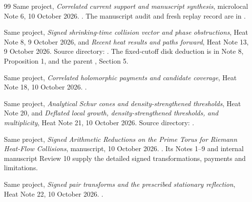 \documentclass[11pt]{article}
\numberwithin{equation}{section}
\theoremstyle{definition}
\theoremstyle{remark}
\begin{document}
\begin{thebibliography}{99}
Same project, \emph{Correlated current support and manuscript synthesis},
microlocal Note 6, 10 October 2026.
.
The manuscript audit and fresh replay record are in
.

Same project, \emph{Signed shrinking-time collision vector and phase
obstructions}, Heat Note 8, 9 October 2026, and
\emph{Recent heat results and paths forward}, Heat Note 13,
9 October 2026. Source directory: .
The fixed-cutoff disk deduction is in Note 8, Proposition 1,
and the parent , Section 5.

Same project, \emph{Correlated holomorphic payments and candidate
coverage}, Heat Note 18, 10 October 2026.
.

Same project, \emph{Analytical Schur cones and density-strengthened
thresholds}, Heat Note 20, and \emph{Deflated local growth,
density-strengthened thresholds, and multiplicity}, Heat Note 21,
10 October 2026. Source directory:
.

Same project, \emph{Signed Arithmetic Reductions on the Prime Torus
for Riemann Heat-Flow Collisions}, manuscript, 10 October 2026.
.
Its Notes 1--9 and internal manuscript Review 10 supply the detailed
signed transformations, payments and limitations.

Same project, \emph{Signed pair transforms and the prescribed stationary
reflection}, Heat Note 22, 10 October 2026.
.
\end{thebibliography}
\end{document}
